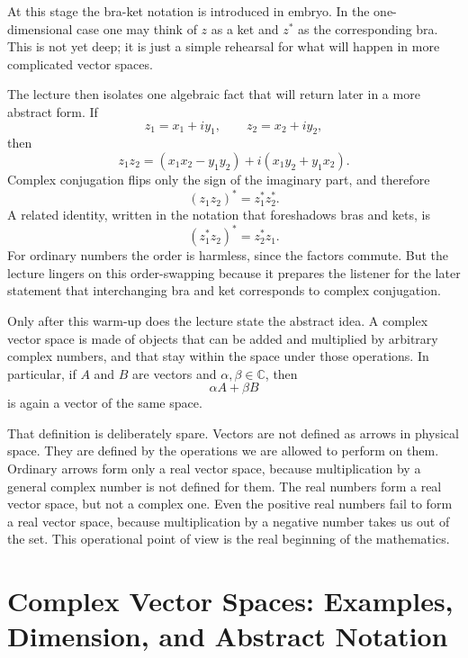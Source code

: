 At this stage the bra-ket notation is introduced in embryo. In the one-dimensional case one may think of \(z\) as a ket and \(z^*\) as the corresponding bra. This is not yet deep; it is just a simple rehearsal for what will happen in more complicated vector spaces.

The lecture then isolates one algebraic fact that will return later in a more abstract form. If
\begin{equation}
z_1 = x_1 + i y_1,
\qquad
z_2 = x_2 + i y_2,
\end{equation}
then
\begin{equation}
z_1 z_2
=
(x_1x_2 - y_1y_2) + i(x_1y_2 + y_1x_2).
\end{equation}
Complex conjugation flips only the sign of the imaginary part, and therefore
\begin{equation}
(z_1 z_2)^* = z_1^* z_2^*.
\end{equation}
A related identity, written in the notation that foreshadows bras and kets, is
\begin{equation}
(z_1^* z_2)^* = z_2^* z_1.
\end{equation}
For ordinary numbers the order is harmless, since the factors commute. But the lecture lingers on this order-swapping because it prepares the listener for the later statement that interchanging bra and ket corresponds to complex conjugation.

Only after this warm-up does the lecture state the abstract idea. A complex vector space is made of objects that can be added and multiplied by arbitrary complex numbers, and that stay within the space under those operations. In particular, if \(A\) and \(B\) are vectors and \(\alpha,\beta \in \mathbb{C}\), then
\begin{equation}
\alpha A + \beta B
\end{equation}
is again a vector of the same space.

That definition is deliberately spare. Vectors are not defined as arrows in physical space. They are defined by the operations we are allowed to perform on them. Ordinary arrows form only a real vector space, because multiplication by a general complex number is not defined for them. The real numbers form a real vector space, but not a complex one. Even the positive real numbers fail to form a real vector space, because multiplication by a negative number takes us out of the set. This operational point of view is the real beginning of the mathematics.

\section{Complex Vector Spaces: Examples, Dimension, and Abstract Notation}

